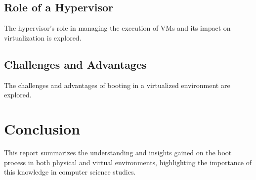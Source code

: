 \documentclass[12pt]{article}
\begin{document}
\subsection{Role of a Hypervisor}
The hypervisor's role in managing the execution of VMs and its impact on virtualization is explored.

\subsection{Challenges and Advantages}
The challenges and advantages of booting in a virtualized environment are explored.

\section{Conclusion}
This report summarizes the understanding and insights gained on the boot process in both physical and virtual environments, highlighting the importance of this knowledge in computer science studies.

\end{document}
